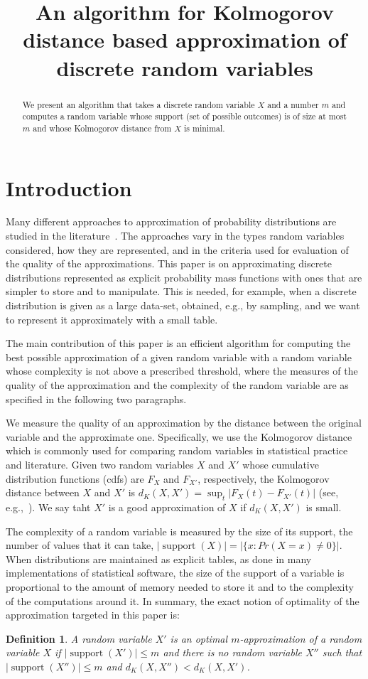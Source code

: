 \documentclass{article}
\title{An algorithm for Kolmogorov distance based approximation of discrete random variables}
\newtheorem{definition}[thm]{Definition}
\DeclareMathOperator{\support}{support}
\begin{document}
\maketitle
\begin{abstract}
	We present an algorithm that takes a discrete random variable $X$ and a number $m$ and computes a random variable whose support (set of possible outcomes) is of size at most $m$ and whose Kolmogorov distance from $X$ is minimal.
\end{abstract}


\section{Introduction}

Many different approaches to approximation of probability distributions are studied in the literature~\cite{AMCR83,pavlikov2016cvar,PS77}. 
The approaches vary in the types random variables considered, how they are represented, and in the criteria used for evaluation of the quality of the approximations. This paper is on approximating discrete distributions represented as explicit probability mass functions with ones that are simpler to store and to manipulate. This is needed, for example, when a discrete distribution is given as a large data-set, obtained, e.g., by sampling, and we want to represent it approximately with a small table.  

The main contribution of this paper is an efficient algorithm for computing the best possible approximation of a given random variable with a random variable whose complexity is not above a prescribed threshold, where the measures of the quality of the approximation and the complexity of the random variable are as specified in the following two paragraphs. 

We measure the quality of an approximation by the distance between the original variable and the approximate one. Specifically, we use the Kolmogorov distance which is  commonly used for comparing random variables in statistical practice and literature. Given two random variables $X$ and $X'$ whose cumulative distribution functions (cdfs) are $F_X$ and $F_{X'}$, respectively, the Kolmogorov distance between $X$ and $X'$ is $d_K(X,X')= \sup_t |F_X(t) - F_{X'}(t)|$ (see, e.g.,~\cite{gibbons2011nonparametric}). We say taht $X'$ is a good approximation of $X$ if $d_K(X,X')$ is small.

The complexity of a random variable is measured by the size of its support, the number of values that it can take, $|\support(X)|=|\{x\colon Pr(X=x) \neq 0\}|$. When distributions are maintained as explicit tables, as done in many implementations of statistical software, the size of the support of a variable is proportional to the amount of memory needed to store it and to the complexity of the computations around it. In summary, the exact notion of optimality of the approximation targeted in this paper is:
\begin{definition}
	A random variable $X'$ is an optimal $m$-approximation of a random variable $X$ if $|\support(X')| \leq m$ and there is no random variable $X''$ such that $|\support(X'')| \leq m$ and $d_K(X,X'') < d_K(X,X')$.
\end{definition}
\end{document}
